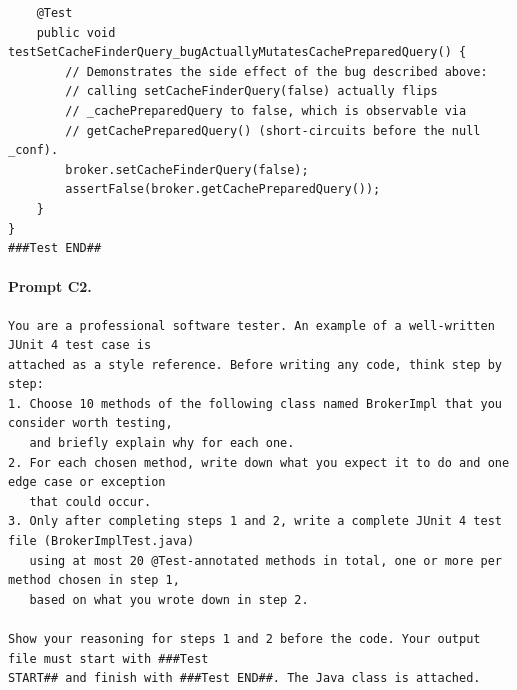 \begin{lstlisting}
    @Test
    public void testSetCacheFinderQuery_bugActuallyMutatesCachePreparedQuery() {
        // Demonstrates the side effect of the bug described above:
        // calling setCacheFinderQuery(false) actually flips
        // _cachePreparedQuery to false, which is observable via
        // getCachePreparedQuery() (short-circuits before the null _conf).
        broker.setCacheFinderQuery(false);
        assertFalse(broker.getCachePreparedQuery());
    }
}
###Test END##
\end{lstlisting}

\paragraph*{Prompt C2.}
\label{prompt:c2}
\begin{lstlisting}
You are a professional software tester. An example of a well-written JUnit 4 test case is
attached as a style reference. Before writing any code, think step by step:
1. Choose 10 methods of the following class named BrokerImpl that you consider worth testing,
   and briefly explain why for each one.
2. For each chosen method, write down what you expect it to do and one edge case or exception
   that could occur.
3. Only after completing steps 1 and 2, write a complete JUnit 4 test file (BrokerImplTest.java)
   using at most 20 @Test-annotated methods in total, one or more per method chosen in step 1,
   based on what you wrote down in step 2.

Show your reasoning for steps 1 and 2 before the code. Your output file must start with ###Test
START## and finish with ###Test END##. The Java class is attached.
\end{lstlisting}

